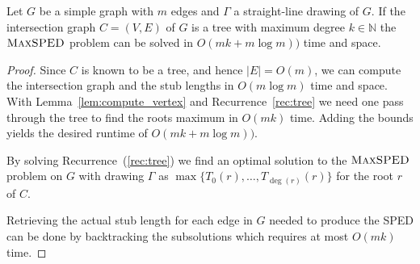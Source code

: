 \documentclass[a4paper,english,numberwithinsect]{eurocg18}
\newcommand{\maxsped}{\ensuremath{\textsc{MaxSPED}}\xspace}
\newcommand{\sollong}{\ensuremath{\textit{long}}\xspace}
\newcommand{\solshort}{\ensuremath{\textit{short}}\xspace}
\begin{document}
\begin{theorem}
	\label{thm:tree}
	Let $ G $ be a simple graph with $m$ edges and $ \Gamma $ a straight-line drawing of $ G $. If the intersection graph $ C = (V,E) $ of $ G $ is a tree with maximum degree $ k \in \mathbb{N} $ the \maxsped problem can be solved in $ O(mk + m \log m)) $ time and space.
\end{theorem}
\begin{proof}
	Since $ C $ is known to be a tree, and hence $ |E| = O(m) $, we can compute the intersection graph and the stub lengths in $ O(m\log m) $ time and space.
	With Lemma~\ref{lem:compute_vertex} and Recurrence~\ref{rec:tree} we need one pass through the tree to find the roots maximum in $ O(mk) $ time. Adding the bounds yields the desired runtime of $ O(mk + m \log m)) $.
%	

By solving Recurrence~(\ref{rec:tree}) we find an optimal solution to the \maxsped problem on $ G $ with drawing $ \Gamma $ as $\max\{T_0(r), \dots, T_{\deg(r)}(r)\}$ for the root $r$ of $C$.	


	Retrieving the actual stub length for each edge in $ G $ needed to produce the SPED can be done by backtracking the subsolutions which requires at most $ O(mk) $ time.
\end{proof}

\end{document}
